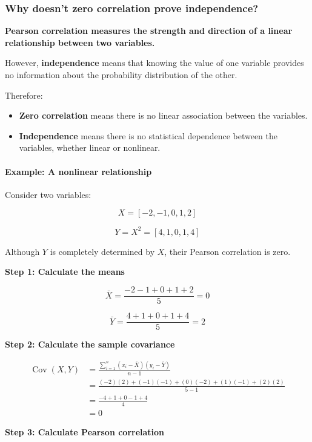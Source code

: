 \documentclass[11pt]{article}
\providecommand{\tightlist}{%
      \setlength{\itemsep}{0pt}\setlength{\parskip}{0pt}}
\begin{document}
    \subsubsection{Why doesn't zero correlation prove
independence?}\label{why-doesnt-zero-correlation-prove-independence}

\textbf{Pearson correlation measures the strength and direction of a
linear relationship between two variables.}

However, \textbf{independence} means that knowing the value of one
variable provides no information about the probability distribution of
the other.

Therefore:

\begin{itemize}
\tightlist
\item
  \textbf{Zero correlation} means there is no linear association between
  the variables.
\item
  \textbf{Independence} means there is no statistical dependence between
  the variables, whether linear or nonlinear.
\end{itemize}

\paragraph{Example: A nonlinear
relationship}\label{example-a-nonlinear-relationship}

Consider two variables:

\[
X=[-2,-1,0,1,2]
\]

\[
Y=X^2=[4,1,0,1,4]
\]

Although \(Y\) is completely determined by \(X\), their Pearson
correlation is zero.

\textbf{Step 1: Calculate the means}

\[
\bar{X}=\frac{-2-1+0+1+2}{5}=0
\]

\[
\bar{Y}=\frac{4+1+0+1+4}{5}=2
\]

\textbf{Step 2: Calculate the sample covariance}

\[
\begin{aligned}
\operatorname{Cov}(X,Y)
&=\frac{\sum_{i=1}^{n}(x_i-\bar{X})(y_i-\bar{Y})}{n-1}\\[6pt]
&=\frac{(-2)(2)+(-1)(-1)+(0)(-2)+(1)(-1)+(2)(2)}{5-1}\\[6pt]
&=\frac{-4+1+0-1+4}{4}\\[6pt]
&=\boxed{0}
\end{aligned}
\]

\textbf{Step 3: Calculate Pearson correlation}
\end{document}
